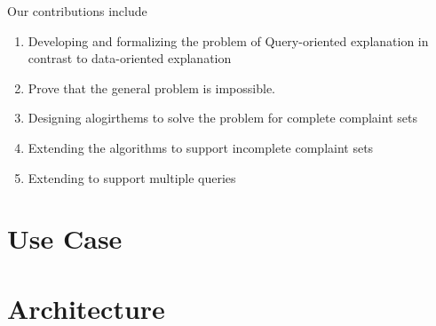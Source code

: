Our contributions include

\begin{enumerate}
\item Developing and formalizing the problem of Query-oriented explanation in contrast to data-oriented explanation
\item Prove that the general problem is impossible.
\item Designing alogirthems to solve the problem for complete complaint sets
\item Extending the algorithms to support incomplete complaint sets
\item Extending to support multiple queries
\end{enumerate}



\section{Use Case}

\section{Architecture}









